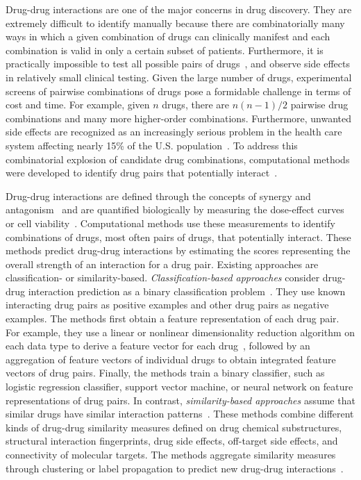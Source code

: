 \documentclass[5p]{elsarticle}
\newcommand{\rev}[1]{{\color{black}#1}}
\begin{document}
Drug-drug interactions are one of the major concerns in drug discovery.
They are extremely difficult to identify manually because there are combinatorially many ways in which a given combination of drugs can clinically manifest and each combination is valid in only a certain subset of patients.
\rev{Furthermore, it is practically impossible} to test all possible pairs of drugs~\citep{Chen2016}, and observe side effects in relatively small clinical testing.
Given the large number of drugs, experimental screens of pairwise combinations of drugs pose a formidable challenge in terms of cost and time.
For example, given $n$ drugs, there are $n(n-1)/2$ pairwise drug combinations and many more higher-order combinations.
Furthermore, unwanted side effects are recognized as an increasingly serious problem in the health care system affecting nearly 15\% of the U.S. population~\cite{Kantor2015}.
To address this combinatorial explosion of candidate drug combinations, computational methods were developed to identify drug pairs that potentially interact~\citep{Ryall2015}.

Drug-drug interactions are defined through the concepts of synergy and antagonism~\citep{Loewe1953,Lewis2015} and are quantified biologically by measuring the dose-effect curves~\citep{Bansal2014,Takeda2017} or cell viability~\citep{Huang2014,Huang2014scirep,Sun2015,Zitnik2016,Chen2016,Chen2016synergy,Shi2017}.
Computational methods use these measurements to identify combinations of drugs, most often pairs of drugs, that potentially interact.
These methods predict drug-drug interactions by estimating the scores representing the overall strength of an interaction for a drug pair.
Existing approaches are classification- or similarity-based.
{\em Classification-based approaches} consider drug-drug interaction prediction as a binary classification problem~\citep{Cheng2014,Huang2014scirep,Zitnik2016,Chen2016,Shi2017,Zheng2017attention}.
They use known interacting drug pairs as positive examples and other drug pairs as negative examples.
The methods first obtain a feature representation of each drug pair.
For example, they use a linear or nonlinear dimensionality reduction algorithm on each data type to derive a feature vector for each drug~\cite{Zitnik2016,Zhao2016drug}, followed by an aggregation of feature vectors of individual drugs to obtain integrated feature vectors of drug pairs.
Finally, the methods train a binary classifier, such as logistic \rev{regression classifier}, support vector \rev{machine}, or neural network on feature representations of drug pairs.
In contrast, {\em similarity-based approaches} assume that similar drugs have similar interaction patterns~\citep{Gottlieb2012,Vilar2012,Huang2014,Li2015,Zitnik2015data,Sun2015,LI2017}.
These methods combine different kinds of drug-drug similarity measures defined on drug chemical substructures, structural interaction fingerprints, drug side effects, off-target side effects, and connectivity of molecular targets.
The methods aggregate similarity measures through clustering or label propagation \rev{to predict new} drug-drug interactions~\citep{Zhang2015label,Ferdousi2017,Zhang2017}.
\end{document}
